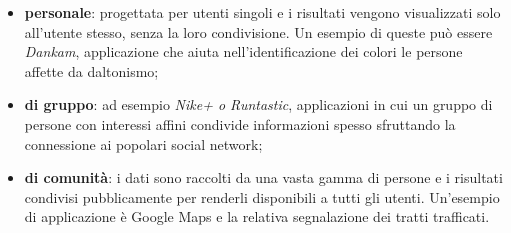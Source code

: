\documentclass[a4paper, 12pt, twoside, openright]{book}
\begin{document}
\begin{itemize}
\item \textbf{personale}: progettata per utenti singoli e i risultati vengono visualizzati solo all'utente stesso, senza la loro condivisione. Un esempio di queste può essere \emph{Dankam}, applicazione che aiuta nell'identificazione dei colori le persone affette da daltonismo;
\item \textbf{di gruppo}: ad esempio \emph{Nike+ o Runtastic}, applicazioni in cui un gruppo di persone con interessi affini condivide informazioni spesso sfruttando la connessione ai popolari social network;
\item \textbf{di comunità}: i dati sono raccolti da una vasta gamma di persone e i risultati condivisi pubblicamente per renderli disponibili a tutti gli utenti. Un'esempio di applicazione è Google Maps e la relativa segnalazione dei tratti trafficati.
\end{itemize}
\end{document}
